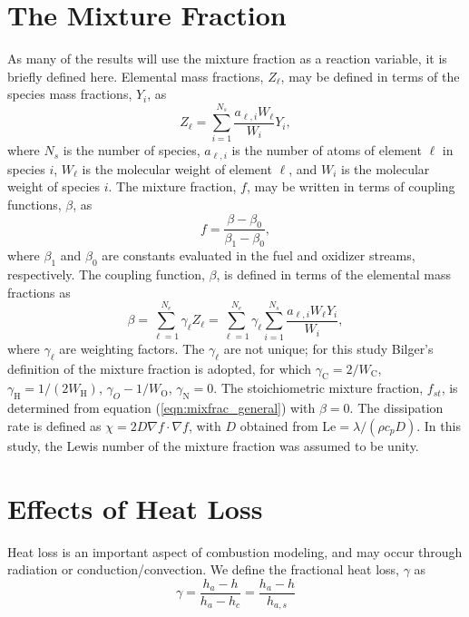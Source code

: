 \documentclass[10pt]{book}
\begin{document}
\section{The Mixture Fraction}
As many of the results will use the mixture fraction as a reaction
variable, it is briefly defined here.  Elemental mass fractions,
$Z_\ell$, may be defined in terms of the species mass fractions,
$Y_i$, as
\begin{equation} \label{eqn:elemMassFrac}
  Z_\ell = \sum_{i=1}^{N_s} \frac{a_{\ell,i} W_\ell}{W_i}  Y_i,
\end{equation}
where $N_s$ is the number of species, $a_{\ell,i}$ is the number of
atoms of element $\ell$ in species $i$, $W_\ell$ is the molecular
weight of element $\ell$, and $W_i$ is the molecular weight of species
$i$.  The mixture fraction, $f$, may be written in terms of coupling
functions, $\beta$, as \cite{williams85}
\begin{equation}  \label{eqn:mixfrac_general}
  f = \frac{\beta-\beta_0}{\beta_1-\beta_0},
\end{equation}
where $\beta_1$ and $\beta_0$ are constants evaluated in the fuel and
oxidizer streams, respectively. The coupling function, $\beta$, is
defined in terms of the elemental mass fractions as
\begin{equation} \label{eqn:betas}
  \beta = \sum_{\ell=1}^{N_e} \gamma_\ell Z_\ell 
  = \sum_{\ell=1}^{N_e} \gamma_\ell \sum_{i=1}^{N_s} \frac{a_{\ell,i} W_\ell Y_i}{W_i},
\end{equation}
where $\gamma_\ell$ are weighting factors.  The $\gamma_\ell$ are not
unique; for this study Bilger's definition \cite{bilger90} of the
mixture fraction is adopted, for which
$\gamma_\mathrm{C}=2/W_\mathrm{C}$, $\gamma_\mathrm{H}=1/(2
W_\mathrm{H})$, $\gamma_O-1/W_\mathrm{O}$, $\gamma_\mathrm{N}=0$.  The
stoichiometric mixture fraction, $f_{st}$, is determined from
equation (\ref{eqn:mixfrac_general}) with $\beta=0$.  The dissipation rate is
defined as $\chi=2D \nabla f \cdot \nabla f$, with $D$ obtained from
$\mathrm{Le}=\lambda/(\rho c_p D)$.  In this study, the Lewis number
of the mixture fraction was assumed to be unity.

\section{Effects of Heat Loss}
Heat loss is an important aspect of combustion modeling, and may occur
through radiation or conduction/convection.  We define the fractional
heat loss, $\gamma$ as
\begin{equation}
  \label{eqn:heatLoss}
  \gamma = \frac{h_a - h}{h_a - h_c}
         = \frac{h_a-h}{h_{a,s}}
\end{equation}
\end{document}
